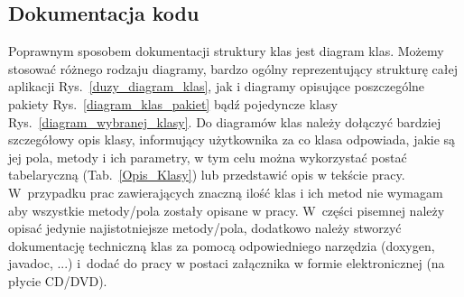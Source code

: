 \documentclass[12pt,a4paper]{article}
\begin{document}
\subsection{Dokumentacja kodu}
 Poprawnym sposobem dokumentacji struktury klas jest diagram klas. Możemy stosować różnego rodzaju diagramy, bardzo ogólny reprezentujący strukturę całej aplikacji Rys.~\ref{duzy_diagram_klas}, jak i diagramy opisujące poszczególne pakiety Rys.~\ref{diagram_klas_pakiet} bądź pojedyncze klasy Rys.~\ref{diagram_wybranej_klasy}. Do diagramów klas należy dołączyć bardziej szczegółowy opis klasy, informujący użytkownika za co klasa odpowiada, jakie są jej pola, metody i ich parametry, w tym celu można wykorzystać postać tabelaryczną (Tab.~\ref{Opis_Klasy}) lub przedstawić opis w tekście pracy. W~przypadku prac zawierających znaczną ilość klas i ich metod nie wymagam aby wszystkie metody/pola zostały opisane w pracy. W~części  pisemnej należy opisać jedynie najistotniejsze metody/pola, dodatkowo należy stworzyć dokumentację techniczną klas za pomocą odpowiedniego narzędzia (doxygen, javadoc, ...) i~dodać do pracy w postaci załącznika w formie elektronicznej (na płycie CD/DVD).
\end{document}
